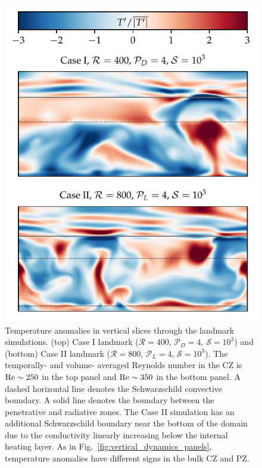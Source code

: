 \documentclass[twocolumn]{aastex631}
\newcommand{\mP}{\ensuremath{\mathcal{P}}}
\newcommand{\mR}{\ensuremath{\mathcal{R}}}
\newcommand{\mS}{\ensuremath{\mathcal{S}}}
\begin{document}
\begin{figure}[t]
\centering
\includegraphics[width=\columnwidth]{lessturb_dynamics_panels.pdf}
\caption{
Temperature anomalies in vertical slices through the landmark simulations.
(top) Case I landmark ($\mR = 400$, $\mP_D = 4$, $\mS = 10^3$) and (bottom) Case II landmark ($\mR = 800$, $\mP_L = 4$, $\mS = 10^3$).
The temporally- and volume- averaged Reynolds number in the CZ is $\rm{Re} \sim 250$ in the top panel and $\rm{Re} \sim 350$ in the bottom panel.
A dashed horizontal line denotes the Schwarzschild convective boundary.
A solid line denotes the boundary between the penetrative and radiative zones.
The Case II simulation has an additional Schwarzschild boundary near the bottom of the domain due to the conductivity linearly increasing below the internal heating layer.
As in Fig.~\ref{fig:vertical_dynamics_panels}, temperature anomalies have different signs in the bulk CZ and PZ.
\label{fig:lessturb_dynamics_panels}
}
\end{figure}
\end{document}
